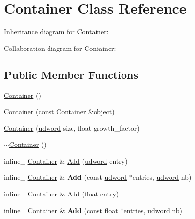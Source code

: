 \hypertarget{class_container}{\section{Container Class Reference}
\label{class_container}
}


Inheritance diagram for Container\+:


Collaboration diagram for Container\+:
\subsection*{Public Member Functions}
\begin{DoxyCompactItemize}
\item 
\hyperlink{class_container_a1b0c5515d6863c1bc98cc93b65952f42}{Container} ()
\item 
\hyperlink{class_container_a38b2b6815b1dbcb61c255aa4b0c6549d}{Container} (const \hyperlink{class_container}{Container} \&object)
\item 
\hyperlink{class_container_a357a6c570a212995f29e0c161d0bdedd}{Container} (\hyperlink{_ice_types_8h_a44c6f1920ba5551225fb534f9d1a1733}{udword} size, float growth\+\_\+factor)
\item 
\hyperlink{class_container_ae9f5d07bfc3defda274aa06091c19f56}{$\sim$\+Container} ()
\item 
inline\+\_\+ \hyperlink{class_container}{Container} \& \hyperlink{class_container_ab02175b19abdd65e70e2ac36c4d098ab}{Add} (\hyperlink{_ice_types_8h_a44c6f1920ba5551225fb534f9d1a1733}{udword} entry)
\item 
\hypertarget{class_container_a8efe7e32963cd5708b2ff5ec44218b09}{inline\+\_\+ \hyperlink{class_container}{Container} \& {\bfseries Add} (const \hyperlink{_ice_types_8h_a44c6f1920ba5551225fb534f9d1a1733}{udword} $\ast$entries, \hyperlink{_ice_types_8h_a44c6f1920ba5551225fb534f9d1a1733}{udword} nb)}\label{class_container_a8efe7e32963cd5708b2ff5ec44218b09}

\item 
inline\+\_\+ \hyperlink{class_container}{Container} \& \hyperlink{class_container_a405dd927b0f31f5d4b1307c6f17cd044}{Add} (float entry)
\item 
\hypertarget{class_container_a73c097e99165dc065ef121fd42017424}{inline\+\_\+ \hyperlink{class_container}{Container} \& {\bfseries Add} (const float $\ast$entries, \hyperlink{_ice_types_8h_a44c6f1920ba5551225fb534f9d1a1733}{udword} nb)}\label{class_container_a73c097e99165dc065ef121fd42017424}


\end{DoxyCompactItemize}
